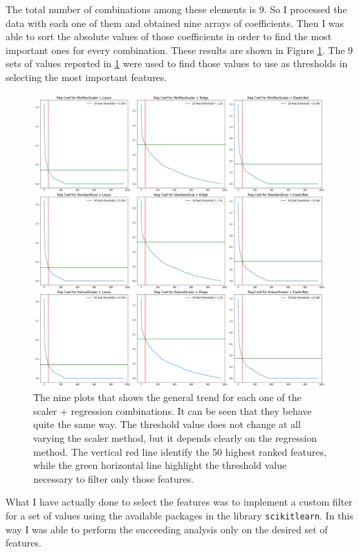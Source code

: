 \documentclass[11pt,a4paper]{report}
\begin{document}
The total number of combinations among these elements is 9. So I processed the data with each one of them and obtained nine arrays of coefficients. Then I was able to sort the absolute values of those coefficients in order to find the most important ones for every combination. These results are shown in Figure \ref{fig:NineCoefPlot}. The 9 sets of values reported in \ref{fig:NineCoefPlot} were used to find those values to use as thresholds in selecting the most important features.

\begin{figure}[H]
  \begin{center}
  \includegraphics[width=0.9\linewidth]{NineCoefPlot.png}
  \caption{\small{The nine plots that shows the general trend for each one of the scaler + regression combinations. It can be seen that they behave quite the same way. The threshold value does not change at all varying the scaler method, but it depends clearly on the regression method. The vertical red line identify the 50 highest ranked features, while the green horizontal line highlight the threshold value necessary to filter only those features.}}
  \label{fig:NineCoefPlot}
  \end{center}
\end{figure}

What I have actually done to select the features was to implement a custom filter for a set of values using the available packages in the library \texttt{scikitlearn}. In this way I was able to perform the succeeding analysis only on the desired set of features.
\end{document}
